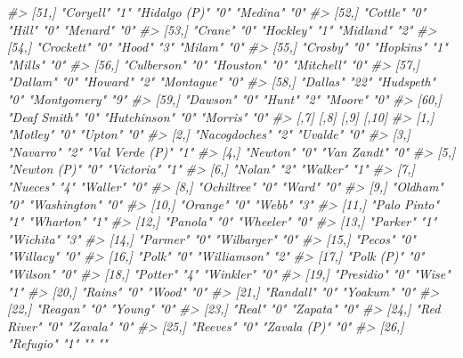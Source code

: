 \documentclass[
  12pt,
]{book}
\newenvironment{Shaded}{\begin{snugshade}}{\end{snugshade}}
\newcommand{\CommentTok}[1]{\textcolor[rgb]{0.37,0.37,0.37}{\textit{#1}}}
\begin{document}
\begin{Shaded}
\begin{Highlighting}[]
\CommentTok{\#> [51,] "Coryell"       "1"  "Hidalgo (P)" "0"  "Medina"        "0" }
\CommentTok{\#> [52,] "Cottle"        "0"  "Hill"        "0"  "Menard"        "0" }
\CommentTok{\#> [53,] "Crane"         "0"  "Hockley"     "1"  "Midland"       "2" }
\CommentTok{\#> [54,] "Crockett"      "0"  "Hood"        "3"  "Milam"         "0" }
\CommentTok{\#> [55,] "Crosby"        "0"  "Hopkins"     "1"  "Mills"         "0" }
\CommentTok{\#> [56,] "Culberson"     "0"  "Houston"     "0"  "Mitchell"      "0" }
\CommentTok{\#> [57,] "Dallam"        "0"  "Howard"      "2"  "Montague"      "0" }
\CommentTok{\#> [58,] "Dallas"        "22" "Hudspeth"    "0"  "Montgomery"    "9" }
\CommentTok{\#> [59,] "Dawson"        "0"  "Hunt"        "2"  "Moore"         "0" }
\CommentTok{\#> [60,] "Deaf Smith"    "0"  "Hutchinson"  "0"  "Morris"        "0" }
\CommentTok{\#>       [,7]            [,8] [,9]            [,10]}
\CommentTok{\#>  [1,] "Motley"        "0"  "Upton"         "0"  }
\CommentTok{\#>  [2,] "Nacogdoches"   "2"  "Uvalde"        "0"  }
\CommentTok{\#>  [3,] "Navarro"       "2"  "Val Verde (P)" "1"  }
\CommentTok{\#>  [4,] "Newton"        "0"  "Van Zandt"     "0"  }
\CommentTok{\#>  [5,] "Newton (P)"    "0"  "Victoria"      "1"  }
\CommentTok{\#>  [6,] "Nolan"         "2"  "Walker"        "1"  }
\CommentTok{\#>  [7,] "Nueces"        "4"  "Waller"        "0"  }
\CommentTok{\#>  [8,] "Ochiltree"     "0"  "Ward"          "0"  }
\CommentTok{\#>  [9,] "Oldham"        "0"  "Washington"    "0"  }
\CommentTok{\#> [10,] "Orange"        "0"  "Webb"          "3"  }
\CommentTok{\#> [11,] "Palo Pinto"    "1"  "Wharton"       "1"  }
\CommentTok{\#> [12,] "Panola"        "0"  "Wheeler"       "0"  }
\CommentTok{\#> [13,] "Parker"        "1"  "Wichita"       "3"  }
\CommentTok{\#> [14,] "Parmer"        "0"  "Wilbarger"     "0"  }
\CommentTok{\#> [15,] "Pecos"         "0"  "Willacy"       "0"  }
\CommentTok{\#> [16,] "Polk"          "0"  "Williamson"    "2"  }
\CommentTok{\#> [17,] "Polk (P)"      "0"  "Wilson"        "0"  }
\CommentTok{\#> [18,] "Potter"        "4"  "Winkler"       "0"  }
\CommentTok{\#> [19,] "Presidio"      "0"  "Wise"          "1"  }
\CommentTok{\#> [20,] "Rains"         "0"  "Wood"          "0"  }
\CommentTok{\#> [21,] "Randall"       "0"  "Yoakum"        "0"  }
\CommentTok{\#> [22,] "Reagan"        "0"  "Young"         "0"  }
\CommentTok{\#> [23,] "Real"          "0"  "Zapata"        "0"  }
\CommentTok{\#> [24,] "Red River"     "0"  "Zavala"        "0"  }
\CommentTok{\#> [25,] "Reeves"        "0"  "Zavala (P)"    "0"  }
\CommentTok{\#> [26,] "Refugio"       "1"  ""              ""   }

\end{Highlighting}
\end{Shaded}
\end{document}
